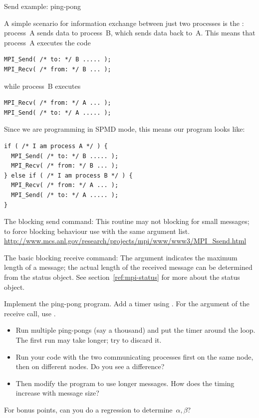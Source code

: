  {Send example: ping-pong}
\label{sec:mpi-send-recv}

A simple scenario for information exchange between just two processes
is the : process~A sends data to process~B, which
sends data back to~A. This means that process~A executes the code
\begin{lstlisting}
MPI_Send( /* to: */ B ..... );
MPI_Recv( /* from: */ B ... );
\end{lstlisting}
while process~B executes
\begin{lstlisting}
MPI_Recv( /* from: */ A ... );
MPI_Send( /* to: */ A ..... );
\end{lstlisting}
Since we are programming in SPMD mode, this means our program looks like:
\begin{lstlisting}
if ( /* I am process A */ ) {
  MPI_Send( /* to: */ B ..... );
  MPI_Recv( /* from: */ B ... );
} else if ( /* I am process B */ ) {
  MPI_Recv( /* from: */ A ... );
  MPI_Send( /* to: */ A ..... );
}
\end{lstlisting}

The blocking send command:
%
%
This routine may not blocking for small messages; to force blocking
behaviour use  with the same argument list.
\url{http://www.mcs.anl.gov/research/projects/mpi/www/www3/MPI_Ssend.html}

The basic blocking receive command:
%
%
The  argument indicates the maximum length of a message; the
actual length of the received message can be determined 
from the status object. See section~\ref{ref:mpi-status}
for more about the status object.

\begin{exercise}
  \label{ex:pingpong}
  Implement the ping-pong program. Add a timer using .
  For the  argument of the receive call, use
  .

  \begin{itemize}
  \item Run multiple ping-pongs (say a thousand) and put the timer
    around the loop. The first run may take longer; try to discard it.
  \item Run your code with the two communicating processes first on
    the same node, then on different nodes. Do you see a difference?
  \item Then modify the program
    to use longer messages. How does the timing increase with message size?
  \end{itemize}
  For bonus points, can you do a regression to determine~$\alpha,\beta$?
\end{exercise}

